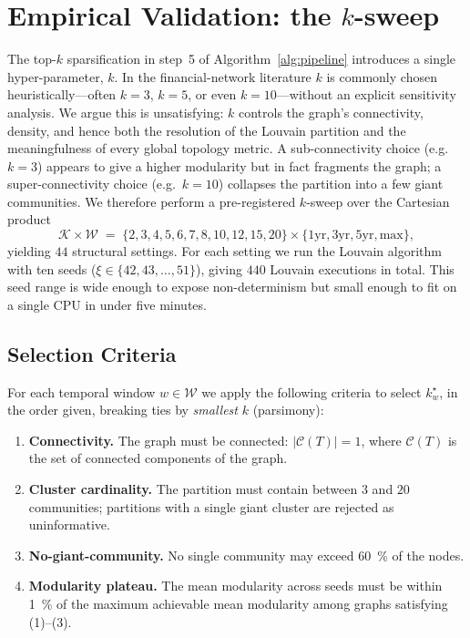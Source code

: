 \section{Empirical Validation: the $k$-sweep}
\label{sec:ksweep}

The top-$k$ sparsification in step~5 of Algorithm~\ref{alg:pipeline}
introduces a single hyper-parameter, $k$.  In the financial-network
literature $k$ is commonly chosen heuristically---often $k=3$, $k=5$,
or even $k=10$---without an explicit sensitivity analysis.  We argue
this is unsatisfying: $k$ controls the graph's connectivity, density,
and hence both the resolution of the Louvain partition and the
meaningfulness of every global topology metric.  A sub-connectivity
choice (e.g.\ $k=3$) appears to give a higher modularity but in fact
fragments the graph; a super-connectivity choice (e.g.\ $k=10$)
collapses the partition into a few giant communities.  We therefore
perform a pre-registered $k$-sweep over the Cartesian product
\begin{equation}
  \mathcal{K}\times\mathcal{W} \;=\;
  \{2,3,4,5,6,7,8,10,12,15,20\}
  \times
  \{\text{1yr},\text{3yr},\text{5yr},\text{max}\},
\end{equation}
yielding $44$ structural settings.  For each setting we run the
Louvain algorithm with ten seeds ($\xi\in\{42,43,\dots,51\}$), giving
$440$ Louvain executions in total.  This seed range is wide enough to
expose non-determinism but small enough to fit on a single CPU in
under five minutes.

\subsection{Selection Criteria}
\label{sec:ksweep-criteria}

For each temporal window $w\in\mathcal{W}$ we apply the following
criteria to select $k^{\star}_w$, in the order given, breaking ties by
\emph{smallest} $k$ (parsimony):
\begin{enumerate}
  \item \textbf{Connectivity.} The graph must be connected:
  $|\mathcal{C}(T)|=1$, where $\mathcal{C}(T)$ is the set of connected
  components of the graph.
  \item \textbf{Cluster cardinality.} The partition must contain between
  $3$ and $20$ communities; partitions with a single giant cluster are
  rejected as uninformative.
  \item \textbf{No-giant-community.} No single community may exceed
  \SI{60}{\percent} of the nodes.
  \item \textbf{Modularity plateau.} The mean modularity across seeds
  must be within \SI{1}{\percent} of the maximum achievable mean
  modularity among graphs satisfying (1)--(3).
\end{enumerate}

